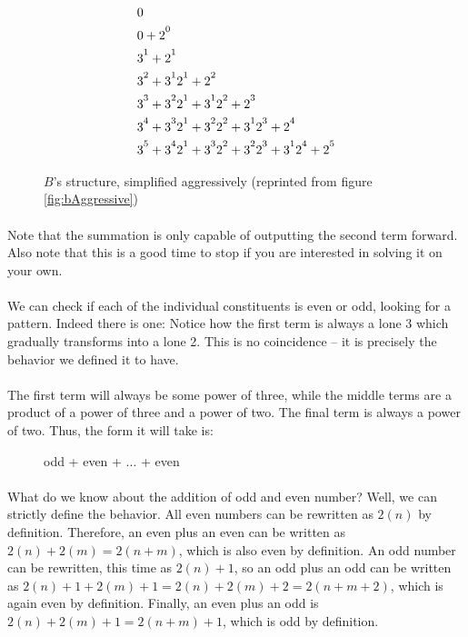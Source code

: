 \documentclass[12pt,letterpaper]{article}
\begin{document}
			\begin{figure*}[h]
				\begin{align*}
				&0\\
				&0 + 2\strut^0\\
				&3\strut^1 + 2\strut^1\\
				&3\strut^2 + 3\strut^1 2\strut^1 + 2\strut^2\\
				&3\strut^3 + 3\strut^2 2\strut^1 + 3\strut^1 2\strut^2 + 2\strut^3\\
				&3\strut^4 + 3\strut^3 2\strut^1 + 3\strut^2 2\strut^2+ 3\strut^1 2\strut^3 + 2\strut^4\\
				&3\strut^5 + 3\strut^4 2\strut^1 + 3\strut^3 2\strut^2+ 3\strut^2 2\strut^3 + 3\strut^1 2\strut^4 + 2\strut^5
				\end{align*}
				
				\caption*{$B$'s structure, simplified aggressively (reprinted from figure \ref{fig:bAggressive})}
			\end{figure*}
		
			\paragraph{} Note that the summation is only capable of outputting the second term forward. Also note that this is a good time to stop if you are interested in solving it on your own.
			
			\paragraph{} We can check if each of the individual constituents is even or odd, looking for a pattern. Indeed there is one: Notice how the first term is always a lone 3 which gradually transforms into a lone 2. This is no coincidence -- it is precisely the behavior we defined it to have.
			
			\paragraph{} The first term will always be some power of three, while the middle terms are a product of a power of three and a power of two. The final term is always a power of two. Thus, the form it will take is:
			
			\begin{figure*}[h]
				\centering
				odd + even + ... + even
			\end{figure*}
		
			\paragraph{} What do we know about the addition of odd and even number? Well, we can strictly define the behavior. All even numbers can be rewritten as $2(n)$ by definition. Therefore, an even plus an even can be written as $2(n) + 2(m) = 2(n + m)$, which is also even by definition. An odd number can be rewritten, this time as $2(n) + 1$, so an odd plus an odd can be written as $2(n) + 1 + 2(m) + 1 = 2(n) + 2(m) + 2 = 2(n + m + 2)$, which is again even by definition. Finally, an even plus an odd is $2(n) + 2(m) + 1 = 2(n + m) + 1$, which is odd by definition.
			
\end{document}
